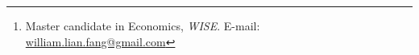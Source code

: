 \author{William Fang\thanks{Master candidate in Economics, \textit{WISE}. E-mail: \href{mailto:william.lian.fang@gmail.com}{william.lian.fang@gmail.com}}  \\%
  }%
%   
\date{\underline{\emph{This Draft Version:} \xxivtime \, \today}}%
